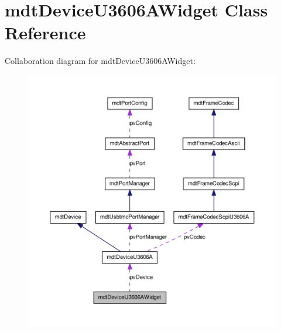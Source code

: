 \hypertarget{classmdt_device_u3606_a_widget}{
\section{mdtDeviceU3606AWidget Class Reference}
\label{classmdt_device_u3606_a_widget}
}


Collaboration diagram for mdtDeviceU3606AWidget:
\nopagebreak
\begin{figure}[H]
\begin{center}
\leavevmode
\includegraphics[width=400pt]{classmdt_device_u3606_a_widget__coll__graph}
\end{center}
\end{figure}
